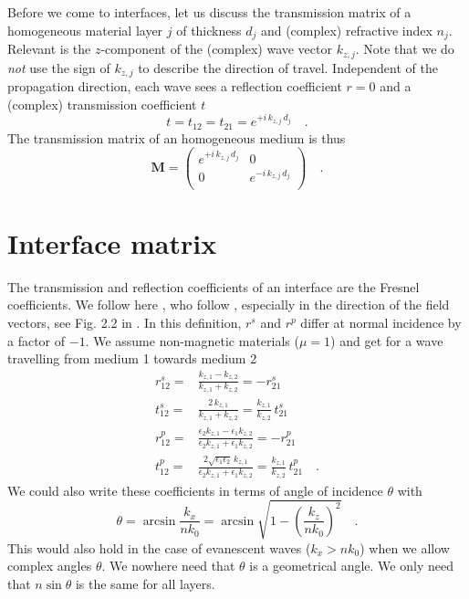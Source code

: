 Before we come to interfaces, let us discuss the transmission matrix of a homogeneous material layer $j$ of thickness $d_j$ and (complex) refractive index $n_j$. Relevant is the $z$-component of the (complex) wave vector $k_{z,j}$. Note that we do \emph{not} use the sign of  $k_{z,j}$ to describe the direction of travel.
Independent of the propagation direction, each wave sees a reflection coefficient $r=0$ and a (complex) transmission coefficient $t$
\begin{equation}
t = t_{12} = t_{21} = e^{+ i \, k_{z,j} \, d_j } \quad . 
\end{equation}
The transmission matrix of an homogeneous medium is thus
\begin{equation}
\mathbf{M} = 
\begin{pmatrix}
e^{+i \, k_{z,j} \, d_j } & 0 \\0 & e^{-i \, k_{z,j} \, d_j } \\
\end{pmatrix} \quad . 
\label{eq:M_prob}
\end{equation}


\section{Interface matrix}

The transmission and reflection coefficients of an interface are the Fresnel coefficients. We follow here \cite{Novotny-Hecht2012}, who follow \cite{BornWolf2002}, especially in the direction of the field vectors, see Fig. 2.2 in \cite{Novotny-Hecht2012}. In this definition,  $r^s$ and $r^p$ differ at normal incidence by a factor of $-1$. We assume non-magnetic materials ($\mu = 1$) and get for a wave travelling from medium 1 towards medium 2
\begin{align}
 r_{12}^s = & \frac{k_{z,1} - k_{z,2}}{k_{z,1} + k_{z,2}}  = - r_{21}^s\\
 t_{12}^s = & \frac{2 \, k_{z,1}}{k_{z,1} + k_{z,2}} =  \frac{k_{z,1}}{k_{z,2}}  \,  t_{21}^s\\
  r_{12}^p = & \frac{\epsilon_2	 k_{z,1} - \epsilon_1 k_{z,2}}
				  {\epsilon_2 k_{z,1} + \epsilon_1 k_{z,2}}  = - r_{21}^p\\
  t_{12}^p = & \frac{2 \sqrt{\epsilon_1 \epsilon_2}	 \,k_{z,1} }
				  {\epsilon_2 k_{z,1} + \epsilon_1 k_{z,2}}  = \frac{k_{z,1}}{k_{z,2}}  \,  t_{21}^p \quad . 
\end{align}
We could also write these coefficients in terms of angle of incidence $\theta$ with
\begin{equation}
 \theta = \arcsin \frac{k_x}{n k_0} = \arcsin \sqrt{1 - \left( \frac{k_z}{n k_0} \right)^2 } \quad . 
\end{equation}
This would also hold in the case of evanescent waves ($k_x > n k_0$) when we allow complex angles $\theta$. We nowhere need that $\theta$ is a geometrical angle. We only need that $n \sin \theta$ is the same for all layers.


